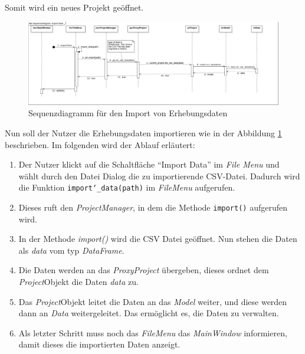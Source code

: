 \documentclass{article}
\begin{document}
Somit wird ein neues Projekt geöffnet.
\begin{figure}[H]%
    \includegraphics[width=15cm]{entwurf/Entwurf_dokument/img/Alissa/SQImportDataFinal.png}
    \caption{Sequenzdiagramm für den Import von Erhebungsdaten}
    \label{fig:sd:importData}
\end{figure}
Nun soll der Nutzer die Erhebungsdaten importieren wie in der Abbildung \ref{fig:sd:importData} beschrieben. Im folgenden wird der Ablauf erläutert:
\begin{enumerate}
    \item[1.] Der Nutzer klickt auf die Schaltfläche \enquote{Import Data} im \textit{File Menu} und wählt durch den Datei Dialog die zu importierende CSV-Datei. Dadurch wird die Funktion \texttt{import\char`_data(path)} im \textit{FileMenu} aufgerufen.
    \item[2.] Dieses ruft den \textit{ProjectManager}, in dem die Methode \texttt{import()} aufgerufen wird.
    \item[3.] In der Methode \textit{import()} wird die CSV Datei geöffnet. Nun stehen die Daten als \textit{data} vom typ \textit{DataFrame}.
    \item[4.] Die Daten werden an das \textit{ProxyProject} übergeben, dieses ordnet dem \textit{Project}\textendash Objekt die Daten \textit{data} zu.
    \item[5.] Das \textit{Project}\textendash Objekt leitet die Daten an das \textit{Model} weiter, und diese werden dann an \textit{Data} weitergeleitet. Das ermöglicht es, die Daten zu verwalten.
    \item[6.] Als letzter Schritt muss noch das \textit{FileMenu} das \textit{MainWindow} informieren, damit dieses die importierten Daten anzeigt. 
\end{enumerate}
\newpage
\end{document}
